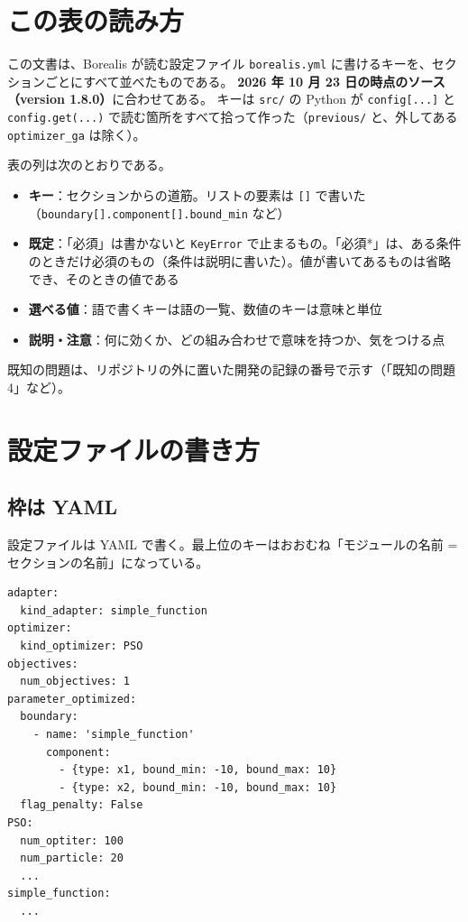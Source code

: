 \section{この表の読み方}

この文書は、Borealis が読む設定ファイル \texttt{borealis.\allowbreak{}yml} に書けるキーを、セクションごとにすべて並べたものである。
\textbf{2026 年 10 月 23 日の時点のソース（version 1.8.0）}に合わせてある。
キーは \texttt{src/\allowbreak{}} の Python が \texttt{config[.\allowbreak{}.\allowbreak{}.\allowbreak{}]\allowbreak{}} と \texttt{config.\allowbreak{}get(.\allowbreak{}.\allowbreak{}.\allowbreak{})} で読む箇所をすべて拾って作った（\texttt{previous/\allowbreak{}} と、外してある \texttt{optimizer\_\allowbreak{}ga} は除く）。

表の列は次のとおりである。

\begin{itemize}
\item \textbf{キー}：セクションからの道筋。リストの要素は \texttt{[]\allowbreak{}} で書いた（\texttt{boundary[]\allowbreak{}.\allowbreak{}component[]\allowbreak{}.\allowbreak{}bound\_\allowbreak{}min} など）
\item \textbf{既定}：「必須」は書かないと \texttt{KeyError} で止まるもの。「必須*」は、ある条件のときだけ必須のもの（条件は説明に書いた）。値が書いてあるものは省略でき、そのときの値である
\item \textbf{選べる値}：語で書くキーは語の一覧、数値のキーは意味と単位
\item \textbf{説明・注意}：何に効くか、どの組み合わせで意味を持つか、気をつける点
\end{itemize}

既知の問題は、リポジトリの外に置いた開発の記録の番号で示す（「既知の問題 4」など）。

\section{設定ファイルの書き方}

\subsection{枠は YAML}

設定ファイルは YAML で書く。最上位のキーはおおむね「モジュールの名前 = セクションの名前」になっている。

\begin{Verbatim}
adapter:
  kind_adapter: simple_function
optimizer:
  kind_optimizer: PSO
objectives:
  num_objectives: 1
parameter_optimized:
  boundary:
    - name: 'simple_function'
      component:
        - {type: x1, bound_min: -10, bound_max: 10}
        - {type: x2, bound_min: -10, bound_max: 10}
  flag_penalty: False
PSO:
  num_optiter: 100
  num_particle: 20
  ...
simple_function:
  ...
\end{Verbatim}

